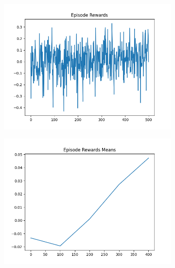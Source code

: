 \begin{figure}[H]
    \centering
    \begin{subfigure}{.47\linewidth}
        \centering
        \includegraphics[width=\textwidth]{mountain/2024-06-15_08-13-32_dqn_mountaincar_episode_rewards.png}
    \end{subfigure}
    \begin{subfigure}{.47\linewidth}
        \centering
        \includegraphics[width=\textwidth]{mountain/2024-06-15_08-13-32_dqn_mountaincar_episode_rewards_means.png}
    \end{subfigure}
    \begin{subfigure}{.47\linewidth}
        \centering

\end{subfigure}
\end{figure}

